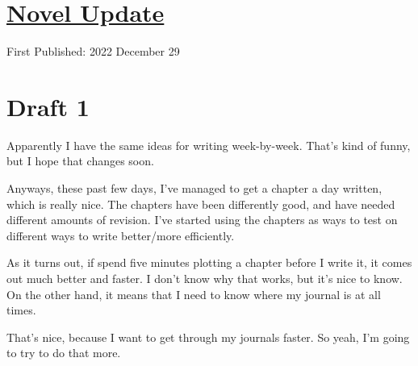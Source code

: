 \documentclass[12pt]{article}[titlepage]
\newcommand{\1}{\={a}}
\newcommand{\2}{\={e}}
\newcommand{\3}{\={\i}}
\newcommand{\4}{\=o}
\newcommand{\5}{\=u}
\newcommand{\6}{\={A}}
\renewcommand{\,}{\textsuperscript{,}}
\begin{document}
\doublespacing
\section{\href{novel-update-8.html}{Novel Update}}
First Published: 2022 December 29


\section{Draft 1}
Apparently I have the same ideas for writing week-by-week.
That's kind of funny, but I hope that changes soon.

Anyways, these past few days, I've managed to get a chapter a day written, which is really nice.
The chapters have been differently good, and have needed different amounts of revision.
I've started using the chapters as ways to test on different ways to write better/more efficiently.

As it turns out, if spend five minutes plotting a chapter before I write it, it comes out much better and faster.
I don't know why that works, but it's nice to know.
On the other hand, it means that I need to know where my journal is at all times.

That's nice, because I want to get through my journals faster.
So yeah, I'm going to try to do that more.
\end{document}
